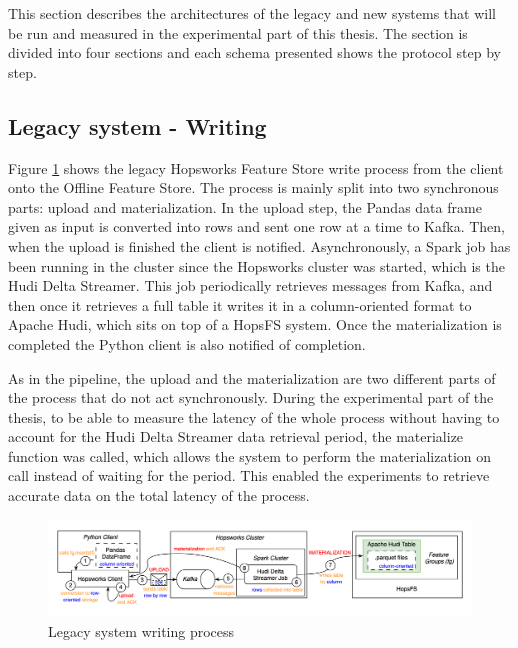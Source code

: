 This section describes the architectures of the legacy and new systems that will be run and measured in the experimental part of this thesis. The section is divided into four sections and each schema presented shows the protocol step by step.

\subsection{Legacy system - Writing}
\label{subsec:legacy_sys_writing}

Figure \ref{fig:featurestore_writing} shows the legacy Hopsworks Feature Store write process from the client onto the Offline Feature Store. The process is mainly split into two synchronous parts: upload and materialization. In the upload step, the Pandas data frame given as input is converted into rows and sent one row at a time to Kafka. Then, when the upload is finished the client is notified. Asynchronously, a Spark job has been running in the cluster since the Hopsworks cluster was started, which is the Hudi Delta Streamer. This job periodically retrieves messages from Kafka, and then once it retrieves a full table it writes it in a column-oriented format to Apache Hudi, which sits on top of a \gls{HopsFS} system. Once the materialization is completed the Python client is also notified of completion.

As in the pipeline, the upload and the materialization are two different parts of the process that do not act synchronously. During the experimental part of the thesis, to be able to measure the latency of the whole process without having to account for the Hudi Delta Streamer data retrieval period, the materialize function was called, which allows the system to perform the materialization on call instead of waiting for the period. This enabled the experiments to retrieve accurate data on the total latency of the process.


\begin{figure}
    \begin{center}
      \includegraphics[width=\textwidth]{figures/2-background/FeatureStore-writing.png}
    \end{center}
    \caption{Legacy system writing process}
    \label{fig:featurestore_writing}
\end{figure}

